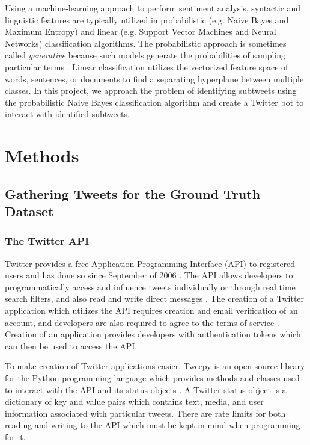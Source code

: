 \documentclass[11pt, twoside, reqno]{book}
\begin{document}
Using a machine-learning approach to perform sentiment analysis, syntactic and linguistic features are typically utilized in probabilistic (e.g. Naive Bayes and Maximum Entropy) and linear (e.g. Support Vector Machines and Neural Networks) classification algorithms. The probabilistic approach is sometimes called \textit{generative} because such models generate the probabilities of sampling particular terms \cite{sentiment_survey}. Linear classification utilizes the vectorized feature space of words, sentences, or documents to find a separating hyperplane between multiple classes. In this project, we approach the problem of identifying subtweets using the probabilistic Naive Bayes classification algorithm and create a Twitter bot to interact with identified subtweets. 

\chapter{Methods}
\label{methods}

\section{Gathering Tweets for the Ground Truth Dataset}
\label{gathering_tweets}

\subsection{The Twitter API}
\label{twitter_api}

Twitter provides a free Application Programming Interface (API) to registered users and has done so since September of 2006 \cite{twitter_api_start}. The API allows developers to programmatically access and influence tweets individually or through real time search filters, and also read and write direct messages \cite{twitter_api_docs}. The creation of a Twitter application which utilizes the API requires creation and email verification of an account, and developers are also required to agree to the terms of service \cite{twitter_tos}. Creation of an application provides developers with authentication tokens which can then be used to access the API.

To make creation of Twitter applications easier, Tweepy \cite{tweepy_python} is an open source library for the Python programming language which provides methods and classes used to interact with the API and its status objects \cite{tweepy_status_object}. A Twitter status object is a dictionary of key and value pairs which contains text, media, and user information associated with particular tweets. There are rate limits for both reading and writing to the API which must be kept in mind when programming for it.
\end{document}
